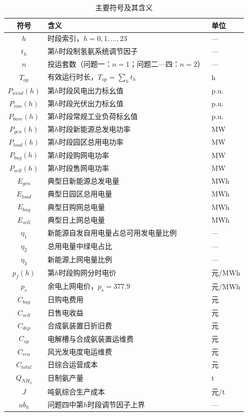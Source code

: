 \documentclass[UTF8,12pt,a4paper]{ctexart}
\begin{document}
\begin{table}[htbp]
\centering
\caption{主要符号及其含义}
\label{tab:symbols}
\begin{tabular}{cll}
\toprule
\textbf{符号} & \textbf{含义} & \textbf{单位} \\
\midrule
$h$ & 时段索引，$h=0,1,\ldots,23$ & — \\
$t_h$ & 第$h$时段制氢氨系统调节因子 & — \\
$n$ & 投运套数（问题一：$n=1$；问题二—四：$n=2$） & — \\
$T_{op}$ & 有效运行时长，$T_{op}=\sum_{h}t_h$ & h \\
$P_{wind}(h)$ & 第$h$时段风电出力标幺值 & p.u. \\
$P_{sun}(h)$ & 第$h$时段光伏出力标幺值 & p.u. \\
$P_{base}(h)$ & 第$h$时段常规工业负荷标幺值 & p.u. \\
$P_{gen}(h)$ & 第$h$时段新能源总发电功率 & MW \\
$P_{load}(h)$ & 第$h$时段园区总用电功率 & MW \\
$P_{buy}(h)$ & 第$h$时段购网电功率 & MW \\
$P_{sell}(h)$ & 第$h$时段售网电功率 & MW \\
$E_{gen}$ & 典型日新能源总发电量 & MWh \\
$E_{load}$ & 典型日园区总用电量 & MWh \\
$E_{buy}$ & 典型日购网总电量 & MWh \\
$E_{sell}$ & 典型日上网总电量 & MWh \\
$\eta_1$ & 新能源自发自用电量占总可用发电量比例 & — \\
$\eta_2$ & 总用电量中绿电占比 & — \\
$\eta_3$ & 新能源上网电量比例 & — \\
$p_f(h)$ & 第$h$时段购网分时电价 & 元/MWh \\
$p_s$ & 余电上网电价，$p_s=377.9$ & 元/MWh \\
$C_{buy}$ & 日购电费用 & 元 \\
$C_{sell}$ & 日售电收益 & 元 \\
$C_{dep}$ & 合成氨装置日折旧费 & 元 \\
$C_{op}$ & 电解槽与合成氨装置运维费 & 元 \\
$C_{ren}$ & 风光发电度电运维费 & 元 \\
$C_{total}$ & 日综合运营成本 & 元 \\
$Q_{NH_3}$ & 日制氨产量 & t \\
$J$ & 吨氨综合生产成本 & 元/t \\
$ub_h$ & 问题四中第$h$时段调节因子上界 & — \\
\bottomrule
\end{tabular}
\end{table}
\end{document}

